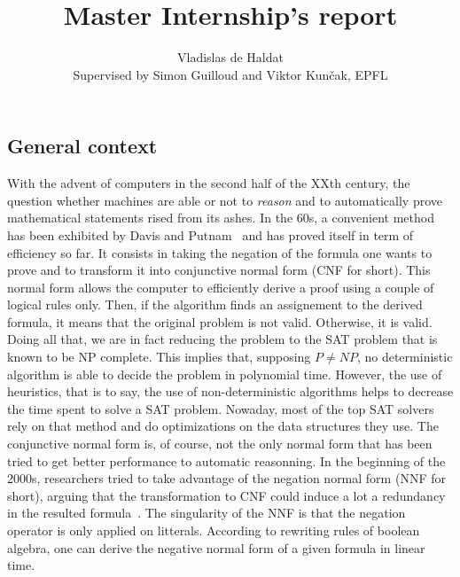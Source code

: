 \documentclass[a4paper, 11pt]{article}
\title{Master Internship's report}
\author{Vladislas de Haldat\\Supervised by Simon Guilloud and Viktor Kunčak, EPFL}
\begin{document}
    \maketitle

	\subsection*{General context}
	With the advent of computers in the second half of the XXth century, the question whether 
	machines are able or not to \textit{reason} and to automatically prove mathematical statements 
	rised from its ashes. In the 60s, a convenient method has been exhibited by Davis and 
	Putnam~\cite{10.1145/321033.321034}
	and has proved itself in term of efficiency so far. It consists in taking the negation of the
	formula one wants to prove and to transform it into conjunctive normal form (CNF for short). 
	This normal form 
	allows the computer to efficiently derive a proof using a couple of logical rules only. Then, if 
	the algorithm finds an assignement to the derived formula, it means that the original problem 
	is not valid. Otherwise, it is valid. Doing all that, we are in fact
	reducing the problem to the SAT problem that is known to be NP complete. This implies that,
	supposing $P\neq NP$, no deterministic algorithm is able to decide the problem in polynomial
	time. However, the use of heuristics, that is to say, the use of non-deterministic algorithms
	helps to decrease the time spent to solve a SAT problem. Nowaday, most of the top SAT solvers
	rely on that method and do optimizations on the data structures they use.
	The conjunctive normal form is, of course,
	not the only normal form that has been tried to get better performance to automatic reasonning.
	In the beginning of the 2000s, researchers tried to take advantage of the negation normal form 
	(NNF for short),
	arguing that the transformation to CNF could induce a lot a redundancy in the resulted 
	formula~\cite{5227064}.
	The singularity of the NNF is that the negation operator is only applied on litterals.
	According to rewriting rules of boolean algebra, one can derive the negative normal form of a
	given formula in linear time. 
\end{document}
